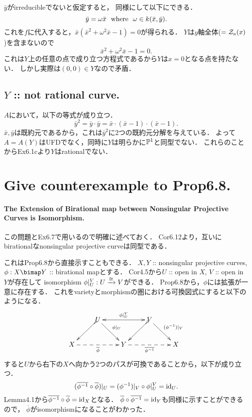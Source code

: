 \documentclass[a4paper]{jsarticle}
\begin{document}
    $\bar{y}$がirreducibleでないと仮定すると，
    同様にして以下にできる．
    \[ \bar{y}=\omega \bar{x} \mwhere \omega \in k(\bar{x}, \bar{y}). \]
    これを$f$に代入すると，$\bar{x}(\bar{x}^2+\omega^2 \bar{x}-1)=0$が得られる．
    $Y$は$y$軸全体($=\zerosa(x)$)を含まないので
    \[ \bar{x}^2+\omega^2 \bar{x}-1=0. \]
    これは$Y$上の任意の点で成り立つ方程式であるから$Y$は$x=0$となる点を持たない．
    しかし実際は$(0,0) \in Y$なので矛盾．


    \subsection{$Y$ :: not rational curve.}
    $A$において，以下の等式が成り立つ．
    \[ \bar{y}^2=\bar{y} \cdot \bar{y}=\bar{x} \cdot (\bar{x}-1) \cdot (\bar{x}-1). \]
    $\bar{x}, \bar{y}$は既約元であるから，これは$\bar{y}^2$に2つの既約元分解を与えている．
    よって$A=A(Y)$はUFDでなく，同時に$Y$は明らかに$\proj^1$と同型でない．
    これらのことからEx6.1cより$Y$はrationalでない．

\section{Give counterexample to Prop6.8.} %
    \paragraph{The Extension of Birational map between Nonsingular Projective Curves is Isomorphism.}
    この問題とEx6.7で用いるので明確に述べておく．
    Cor6.12より，互いにbirationalなnonsingular projective curveは同型である．

    これはProp6.8から直接示すこともできる．
    $X,Y$ :: nonsingular projective curves, $\phi: X \bimap Y$ :: birational mapとする．
    Cor4.5から$U$ :: open in $X$, $V$ :: open in $Y$が存在して
    isomorphism $\phi|_U^V: U \isomap V$ができる．
    Prop6.8から，$\phi$には拡張が一意に存在する．
    これをvarietyとmorphismの圏における可換図式にすると以下のようになる．
    \[
    \xymatrix
    {
    {} & U \ar@{>->}[dl] \ar[dr]^-{\phi|_U} \ar@{<->}^-{\phi|_U^V}[rr] & {} & V \ar@{>->}[dl] \ar[dr]^-{(\phi^{-1})|_V} & {} \\
    X \ar@{-->}_-{\overline{\phi}}[rr] & {} & Y \ar@{-->}_-{\overline{\phi^{-1}}}[rr]& {} & X
    }
    \]
    すると$U$から右下の$X$へ向かう2つのパスが可換であることから，以下が成り立つ．
    \[ (\overline{\phi^{-1}} \circ \overline{\phi})|_U=(\phi^{-1})|_V \circ \phi|_U^V=\id[U]. \]
    Lemma4.1から$\overline{\phi^{-1}} \circ \overline{\phi}=\id[X]$となる．
    $\overline{\phi} \circ \overline{\phi^{-1}}=\id[Y]$も同様に示すことができるので，
    $\overline{\phi}$がisomorphismになることがわかった．
\end{document}

